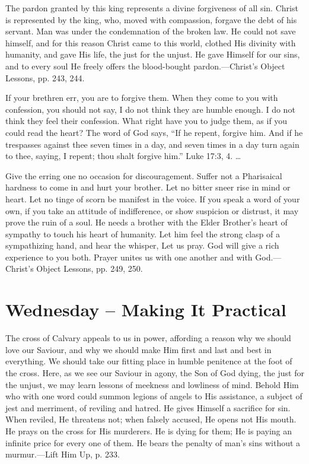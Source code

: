 \documentclass[a4paper, 10pt, twoside, headings=small]{scrartcl}
\begin{document}
\begin{multicols}{2}
The pardon granted by this king represents a divine forgiveness of all sin. Christ is represented by the king, who, moved with compassion, forgave the debt of his servant. Man was under the condemnation of the broken law. He could not save himself, and for this reason Christ came to this world, clothed His divinity with humanity, and gave His life, the just for the unjust. He gave Himself for our sins, and to every soul He freely offers the blood-bought pardon.—Christ’s Object Lessons, pp. 243, 244.

If your brethren err, you are to forgive them. When they come to you with confession, you should not say, I do not think they are humble enough. I do not think they feel their confession. What right have you to judge them, as if you could read the heart? The word of God says, “If he repent, forgive him. And if he trespasses against thee seven times in a day, and seven times in a day turn again to thee, saying, I repent; thou shalt forgive him.” Luke 17:3, 4. …

Give the erring one no occasion for discouragement. Suffer not a Pharisaical hardness to come in and hurt your brother. Let no bitter sneer rise in mind or heart. Let no tinge of scorn be manifest in the voice. If you speak a word of your own, if you take an attitude of indifference, or show suspicion or distrust, it may prove the ruin of a soul. He needs a brother with the Elder Brother’s heart of sympathy to touch his heart of humanity. Let him feel the strong clasp of a sympathizing hand, and hear the whisper, Let us pray. God will give a rich experience to you both. Prayer unites us with one another and with God.—Christ’s Object Lessons, pp. 249, 250.

\section*{Wednesday – Making It Practical}

The cross of Calvary appeals to us in power, affording a reason why we should love our Saviour, and why we should make Him first and last and best in everything. We should take our fitting place in humble penitence at the foot of the cross. Here, as we see our Saviour in agony, the Son of God dying, the just for the unjust, we may learn lessons of meekness and lowliness of mind. Behold Him who with one word could summon legions of angels to His assistance, a subject of jest and merriment, of reviling and hatred. He gives Himself a sacrifice for sin. When reviled, He threatens not; when falsely accused, He opens not His mouth. He prays on the cross for His murderers. He is dying for them; He is paying an infinite price for every one of them. He bears the penalty of man’s sins without a murmur.—Lift Him Up, p. 233.


\end{multicols}
\end{document}
